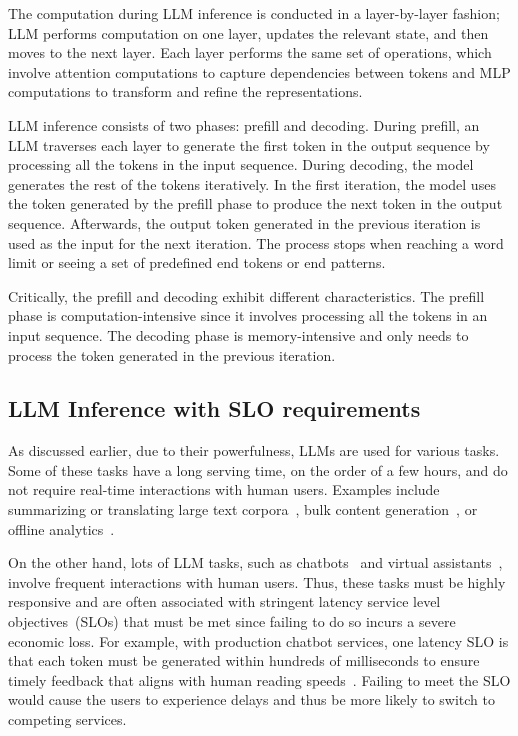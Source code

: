 %
The computation during LLM inference is conducted in a layer-by-layer fashion; 
% 
LLM performs computation on one layer, updates the relevant state, and 
then moves to the next layer. 
%
Each layer performs the same set of operations, which involve attention computations to capture dependencies between tokens and MLP computations to transform and refine the representations. 



%

%
LLM inference consists of two phases: prefill and decoding.
%
During prefill, an LLM traverses each layer to generate the first token in the output sequence by processing all the tokens in the input sequence.
%
During decoding, the model generates the rest of the tokens iteratively. 
% 
In the first iteration, the model uses the token generated by the prefill phase
to produce the next token in the output sequence. 
%
Afterwards, the output token generated in the previous iteration 
is used as the input for the next iteration. 
%
The process stops when reaching a word limit or seeing a set of predefined end tokens or end patterns.
%

Critically, the prefill and decoding exhibit different characteristics.
%
The prefill phase is computation-intensive since it involves processing all the tokens in an input sequence.
%
The decoding phase is memory-intensive and only needs to process the token generated in the previous iteration. 
%


\subsection{LLM Inference with SLO requirements}
\label{sec:slo}
%
As discussed earlier, due to their powerfulness, LLMs are used for various tasks. 
%
Some of these tasks have a long serving time, on the order of a few hours, 
and do 
not require real-time interactions with human users. 
%
Examples include summarizing or translating large text corpora~\cite{hjx1, hjx2, hjx3}, 
bulk content generation~\cite{hjx4}, or offline analytics~\cite{hjx5, hjx6}. 
%

%
On the other hand, lots of LLM tasks, such as chatbots~\cite{chatbot1, chatbot2} and virtual assistants~\cite{virtualassist}, involve frequent interactions with human users.  
%
Thus, these tasks must be highly responsive and are often associated with  stringent latency service level objectives~(SLOs) that must be met since 
failing to do so incurs a severe economic loss.
%
For example, with production chatbot services, one latency SLO is that each token must be generated within hundreds of milliseconds to ensure timely feedback that aligns with human reading speeds~\cite{humanspeed}. 
%
Failing to meet the SLO would cause the users to experience delays and thus be more likely to switch to competing services. 



